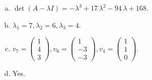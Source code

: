 \begin{questions}
\begin{solution}
\begin{enumerate}[(a)]
\item $\det(A-\lambda I)=-{\lambda}^{3} + 17 \, {\lambda}^{2} - 94 \, {\lambda} + 168$.
\item ${\lambda}_1=7, {\lambda}_2=6, {\lambda}_3=4$.
\item $v_{7}=\left(\begin{array}{r}
1 \\
4 \\
3
\end{array}\right), v_{6}=\left(\begin{array}{r}
1 \\
-3 \\
-3
\end{array}\right), v_{4}=\left(\begin{array}{r}
1 \\
1 \\
0
\end{array}\right)$.
\item Yes.
\end{enumerate}
\end{solution}

\end{questions}

\newpage


\begin{center}
\end{center}

